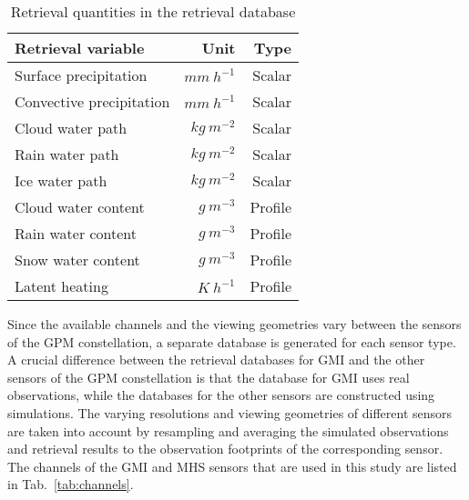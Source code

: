 \documentclass[journal abbreviation, manuscript]{copernicus}
\begin{document}
\begin{table}
  \caption{Retrieval quantities in the retrieval database}
  \label{tab:variables}
  \centering
  \begin{tabular}{l|rr}
    Retrieval variable & Unit & Type\\
    \hline
    Surface precipitation & $\unit{mm\ h^{-1}}$ & Scalar \\
    Convective precipitation & $\unit{mm\ h^{-1}}$ & Scalar \\
    Cloud water path & $\unit{kg\ m^{-2}}$ & Scalar \\
    Rain water path & $\unit{kg\ m^{-2}}$ & Scalar \\
    Ice water path & $\unit{kg\ m^{-2}}$ & Scalar \\
    Cloud water content & $\unit{g\ m^{-3}}$ & Profile \\
    Rain water content & $\unit{g\ m^{-3}}$ & Profile \\
    Snow water content & $\unit{g\ m^{-3}}$ & Profile \\
    Latent heating & $\unit{K \ h^{-1}}$ & Profile \\
  \end{tabular}
\end{table}

Since the available channels and the viewing geometries vary between the
sensors of the GPM constellation, a separate database is generated for each
sensor type. A crucial difference between the retrieval databases for GMI and
the other sensors of the GPM constellation is that the database for GMI uses
real observations, while the databases for the other sensors are constructed
using simulations. The varying resolutions and viewing geometries of different
sensors are taken into account by resampling and averaging the simulated
observations and retrieval results to the observation footprints of the
corresponding sensor. The channels of the GMI and MHS sensors that are used in
this study are listed in Tab.~\ref{tab:channels}.
\end{document}
